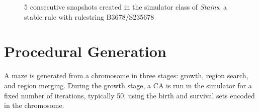 \begin{figure}[!h]
\centering
            \hfill
            \hfill
            \hfill
            \hfill
            \hfill
            \caption{5 consecutive snapshots created in the simulator class of \textit{Stains}, a stable rule with rulestring B3678/S235678}
\label{fig:stains}
\end{figure}

\section{Procedural Generation} \label{sec:proc-gen}
A maze is generated from a chromosome in three stages: growth, region search, and region merging. During the growth stage, a CA is run in the simulator for a fixed number of iterations, typically 50, using the birth and survival sets encoded in the chromosome. 

